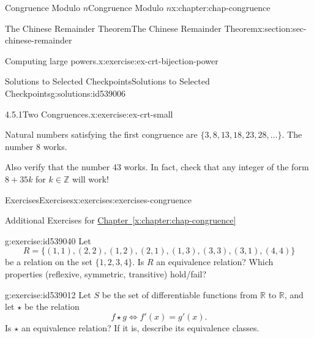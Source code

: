 \documentclass[oneside,10pt,]{book}
\newcommand{\xreffont}{\relax}
\numberwithin{equation}{section}
\begin{document}
\begin{chapterptx}{Congruence Modulo \(n\)}{}{Congruence Modulo \(n\)}{}{}{x:chapter:chap-congruence}
\begin{sectionptx}{The Chinese Remainder Theorem}{}{The Chinese Remainder Theorem}{}{}{x:section:sec-chinese-remainder}
\begin{inlineexercise}{Computing large powers.}{x:exercise:ex-crt-bijection-power}
\end{inlineexercise}%
%
%
\typeout{************************************************}
\typeout{************************************************}
%
\begin{solutions-subsection-numberless}{Solutions to Selected Checkpoints}{}{Solutions to Selected Checkpoints}{}{}{g:solutions:id539006}
\begin{inlinesolution}{4.5.1}{Two Congruences.}{x:exercise:ex-crt-small}%
\par\smallskip%
\noindent\hypertarget{g:solution:id538537-main}{}Natural numbers satisfying the first congruence are \(\{3, 8, 13, 18, 23, 28, \ldots\}\). The number 8 works.%
\par
Also verify that the number 43 works. In fact, check that any integer of the form \(8 + 35k\) for \(k \in \mathbb{Z}\) will work!%
\end{inlinesolution}%
\end{solutions-subsection-numberless}
\end{sectionptx}
%
%
\typeout{************************************************}
\typeout{************************************************}
%
\begin{exercises-section}{Exercises}{}{Exercises}{}{}{x:exercises:exercises-congruence}
\begin{introduction}{}%
Additional Exercises for \hyperref[x:chapter:chap-congruence]{Chapter~{\xreffont\ref{x:chapter:chap-congruence}}}%
\end{introduction}%
\begin{divisionexercise}{1}{}{}{g:exercise:id539040}%
Let%
\begin{equation*}
R = \{(1,1),(2,2),(1,2),(2,1),(1,3),(3,3),(3,1),(4,4)\}
\end{equation*}
be a relation on the set \(\{1,2,3,4\}\). Is \(R\) an equivalence relation? Which properties (reflexive, symmetric, transitive) hold\slash{}fail?%
\end{divisionexercise}%
\begin{divisionexercise}{2}{}{}{g:exercise:id539012}%
Let \(S\) be the set of differentiable functions from \(\mathbb{R}\) to \(\mathbb{R}\), and let \(\star\) be the relation%
\begin{equation*}
f \star g \Leftrightarrow f'(x) = g'(x)\text{.}
\end{equation*}
Is \(\star\) an equivalence relation? If it is, describe its equivalence classes.%
\end{divisionexercise}%

\end{exercises-section}
\end{chapterptx}
\end{document}
